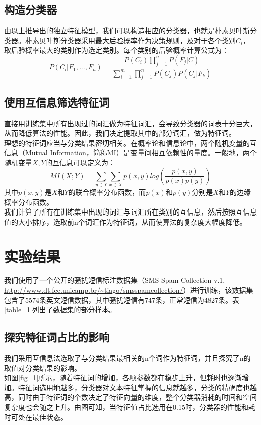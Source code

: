 \documentclass[a4paper, twocolumn, 12pt]{article}
\begin{document}
\subsection{构造分类器}
由以上推导出的独立特征模型，我们可以构造相应的分类器，也就是朴素贝叶斯分类器。朴素贝叶斯分类器采用最大后验概率作为决策规则，及对于各个类别$C_i$，取后验概率最大的类别作为选定类别。每个类别的后验概率计算公式为：
\[P(C_i|F_1, ..., F_n)=\frac{P(C_i)\prod_{j=1}^nP(F_j|C)}{\sum_{i=1}^m \prod_{j=1}^nP(C_j)P(C_j|F_k)}\]

\subsection{使用互信息筛选特征词}
直接用训练集中所有出现过的词汇做为特征词汇，会导致分类器的词表十分巨大，从而降低算法的性能。因此，我们决定提取其中的部分词汇，做为特征词。\\

理想的特征词应当与分类结果密切相关。在概率论和信息论中，两个随机变量的互信息（Mutual Information，简称MI）是变量间相互依赖性的量度。一般地，两个随机变量$X, Y$的互信息可以定义为：
\[MI(X; Y)=\sum_{y\in Y}\sum_{x\in X}p(x, y)log(\frac{p(x, y)}{p(x)p(y)})\]
其中$p(x,y)$是$X$和$Y$的联合概率分布函数，而$p(x)$和$p(y)$分别是$X$和$Y$的边缘概率分布函数。\\

我们计算了所有在训练集中出现的词汇与词汇所在类别的互信息，然后按照互信息值的大小排序，选取前n个词汇作为特征词，从而使算法的复杂度大幅度降低。

\section{实验结果}

我们使用了一个公开的骚扰短信标注数据集（SMS Spam Collection v.1, \url{http://www.dt.fee.unicamp.br/~tiago/smsspamcollection/}）进行训练，该数据集包含了5574条英文短信数据，其中骚扰短信有747条，正常短信为4827条。表\ref{table_1}列出了数据集的部分样本。\\

\subsection{探究特征词占比的影响}
我们采用互信息法选取了与分类结果最相关的n个词作为特征词，并且探究了n的取值对分类结果的影响。\\

如图\ref{fig_1}所示，随着特征词的增加，各项参数都在稳步上升，但耗时也逐渐增加。特征词选用地越多，分类器对文本特征掌握的信息就越多，分类的精确度也越高，同时由于特征词的个数决定了特征向量的维度，整个分类器消耗的时间和空间复杂度也会随之上升。由图可知，当特征值占比选用在0.15时，分类器的性能和耗时可处在最佳状态。
\end{document}
